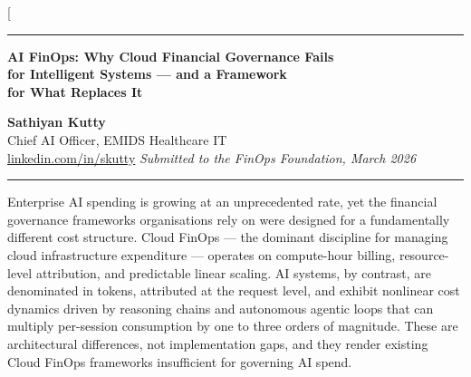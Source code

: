 \documentclass[11pt,twocolumn]{article}
\begin{document}
\twocolumn[{%
\begin{@twocolumnfalse}

\vspace*{4pt}
{\color{teal}\rule{\linewidth}{2pt}}
\vspace{6pt}

{\noindent\LARGE\bfseries\color{navy}
AI FinOps: Why Cloud Financial Governance Fails\\[4pt]
for Intelligent Systems --- and a Framework\\[4pt]
for What Replaces It}

\vspace{10pt}

{\noindent\large\bfseries Sathiyan Kutty}\\[2pt]
{\noindent\normalsize Chief AI Officer, EMIDS Healthcare IT\\
\href{https://www.linkedin.com/in/skutty/}{linkedin.com/in/skutty}
\hfill
\textit{Submitted to the FinOps Foundation, March 2026}}

\vspace{8pt}
{\color{teal}\rule{\linewidth}{0.6pt}}
\vspace{10pt}

\begin{onecolabstract}
\noindent
Enterprise AI spending is growing at an unprecedented rate, yet the financial governance
frameworks organisations rely on were designed for a fundamentally different cost structure.
Cloud FinOps --- the dominant discipline for managing cloud infrastructure expenditure ---
operates on compute-hour billing, resource-level attribution, and predictable linear
scaling. AI systems, by contrast, are denominated in tokens, attributed at the
request level, and exhibit nonlinear cost dynamics driven by reasoning chains and
autonomous agentic loops that can multiply per-session consumption by one to three
orders of magnitude. These are architectural differences, not implementation gaps,
and they render existing Cloud FinOps frameworks insufficient for governing AI spend.


\end{onecolabstract}
\end{@twocolumnfalse}}
\end{document}
